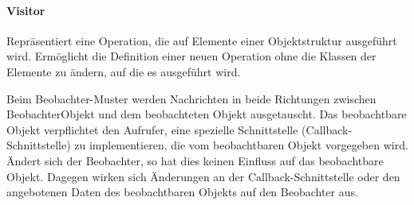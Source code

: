 \paragraph{Visitor}\label{visitor}

Repräsentiert eine Operation, die auf Elemente einer Objektstruktur ausgeführt
wird. Ermöglicht die Definition einer neuen Operation ohne die Klassen der
Elemente zu ändern, auf die es ausgeführt wird.

Beim Beobachter-Muster werden Nachrichten in beide Richtungen zwischen
BeobachterObjekt und dem beobachteten Objekt ausgetauscht. Das beobachtbare
Objekt verpflichtet den Aufrufer, eine spezielle Schnittstelle
(Callback-Schnittstelle) zu implementieren, die vom beobachtbaren Objekt
vorgegeben wird. Ändert sich der Beobachter, so hat dies keinen Einfluss auf das
beobachtbare Objekt. Dagegen wirken sich Änderungen an der
Callback-Schnittstelle oder den angebotenen Daten des beobachtbaren Objekts auf
den Beobachter aus.
